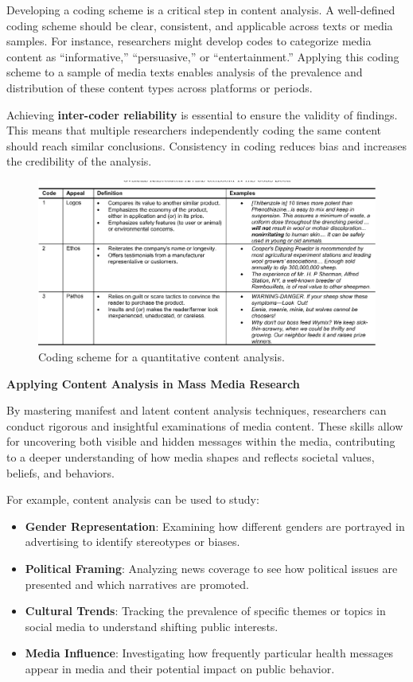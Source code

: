 \documentclass[
]{book}
\providecommand{\tightlist}{%
  \setlength{\itemsep}{0pt}\setlength{\parskip}{0pt}}
\begin{document}
Developing a coding scheme is a critical step in content analysis. A well-defined coding scheme should be clear, consistent, and applicable across texts or media samples. For instance, researchers might develop codes to categorize media content as ``informative,'' ``persuasive,'' or ``entertainment.'' Applying this coding scheme to a sample of media texts enables analysis of the prevalence and distribution of these content types across platforms or periods.

Achieving \textbf{inter-coder reliability} is essential to ensure the validity of findings. This means that multiple researchers independently coding the same content should reach similar conclusions. Consistency in coding reduces bias and increases the credibility of the analysis.

\begin{figure}
\centering
\includegraphics{images/quant-content-scheme.png}
\caption{Coding scheme for a quantitative content analysis.}
\end{figure}

\textbf{Applying Content Analysis in Mass Media Research}

By mastering manifest and latent content analysis techniques, researchers can conduct rigorous and insightful examinations of media content. These skills allow for uncovering both visible and hidden messages within the media, contributing to a deeper understanding of how media shapes and reflects societal values, beliefs, and behaviors.

For example, content analysis can be used to study:

\begin{itemize}
\tightlist
\item
  \textbf{Gender Representation}: Examining how different genders are portrayed in advertising to identify stereotypes or biases.
\item
  \textbf{Political Framing}: Analyzing news coverage to see how political issues are presented and which narratives are promoted.
\item
  \textbf{Cultural Trends}: Tracking the prevalence of specific themes or topics in social media to understand shifting public interests.
\item
  \textbf{Media Influence}: Investigating how frequently particular health messages appear in media and their potential impact on public behavior.
\end{itemize}
\end{document}
